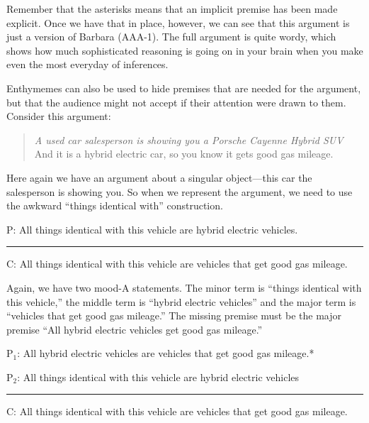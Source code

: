 {Remember that the asterisks means that an implicit premise has been made explicit. Once we have that in place, however, we can see that this argument is just a version of Barbara (AAA-1). The full argument is quite wordy, which shows how much sophisticated reasoning is going on in your brain when you make even the most everyday of inferences. 

Enthymemes can also be used to hide premises that are needed for the argument, but that the audience might not accept if their attention were drawn to them. Consider this argument:

\begin{quotation}\noindent \textit{A used car salesperson is showing you a Porsche Cayenne Hybrid SUV} And it is a hybrid electric car, so you know it gets good gas mileage. \end{quotation}

Here again we have an argument about a singular object---this car the salesperson is showing you. So when we represent the argument, we need to use the awkward ``things identical with'' construction.

\begin{earg}
\item[P:] All things identical with this vehicle are hybrid electric vehicles.
\vspace{-.5em}
\item [] \rule{0.7\linewidth}{.5pt} 
\item[C:] All things identical with this vehicle are vehicles that get good gas mileage.
\end{earg} 

Again, we have two mood-A statements. The minor term is ``things identical with this vehicle,'' the middle term is ``hybrid electric vehicles'' and the major term is ``vehicles that get good gas mileage.'' The missing premise must be the major premise ``All hybrid electric vehicles get good gas mileage.'' 

\begin{earg}
\item[P$_1$:] All hybrid electric vehicles are vehicles that get good gas mileage.*
\item[P$_2$:] All things identical with this vehicle are hybrid electric vehicles
\vspace{-.5em}
\item [] \rule{0.7\linewidth}{.5pt} 
\item[C:] All things identical with this vehicle are vehicles that get good gas mileage.
\end{earg} 

}
